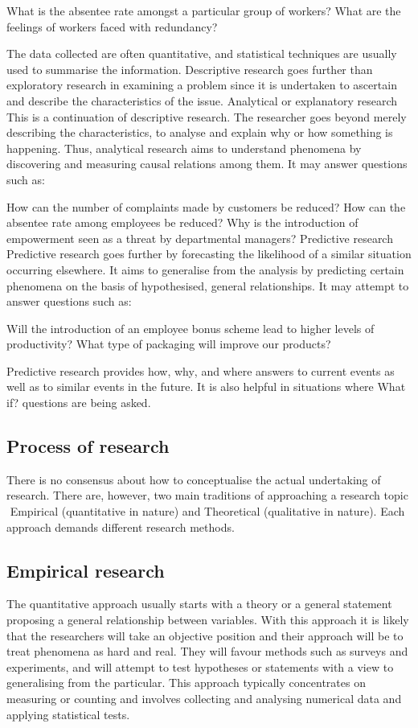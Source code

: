 \documentclass[12pt, a4paper]{report}
\begin{document}
What is the absentee rate amongst a particular group of workers?
What are the feelings of workers faced with redundancy?

The data collected are often quantitative, and statistical techniques are usually used to summarise the information. Descriptive research goes further than exploratory research in examining a problem since it is undertaken to ascertain and describe the characteristics of the issue.
Analytical or explanatory research
This is a continuation of descriptive research. The researcher goes beyond merely describing the characteristics, to analyse and explain why or how something is happening. Thus, analytical research aims to understand phenomena by discovering and measuring causal relations among them. It may answer questions such as:

How can the number of complaints made by customers be reduced?
How can the absentee rate among employees be reduced?
Why is the introduction of empowerment seen as a threat by departmental managers?
Predictive research
Predictive research goes further by forecasting the likelihood of a similar situation occurring elsewhere. It aims to generalise from the analysis by predicting certain phenomena on the basis of hypothesised, general relationships. It may attempt to answer questions such as:

Will the introduction of an employee bonus scheme lead to higher levels of productivity?
What type of packaging will improve our products?

Predictive research provides how, why, and where answers to current events as well as to similar events in the future. It is also helpful in situations where What if? questions are being asked.

\subsection{Process of research}

There is no consensus about how to conceptualise the actual undertaking of research. There are, however, two main traditions of approaching a research topic  Empirical (quantitative in nature) and Theoretical (qualitative in nature). Each approach demands different research methods.
\subsection{Empirical research}
The quantitative approach usually starts with a theory or a general statement proposing a general relationship between variables. With this approach it is likely that the researchers will take an objective position and their approach will be to treat phenomena as hard and real. They will favour methods such as surveys and experiments, and will attempt to test hypotheses or statements with a view to generalising from the particular. This approach typically concentrates on measuring or counting and involves collecting and analysing numerical data and applying statistical tests.
\end{document}
